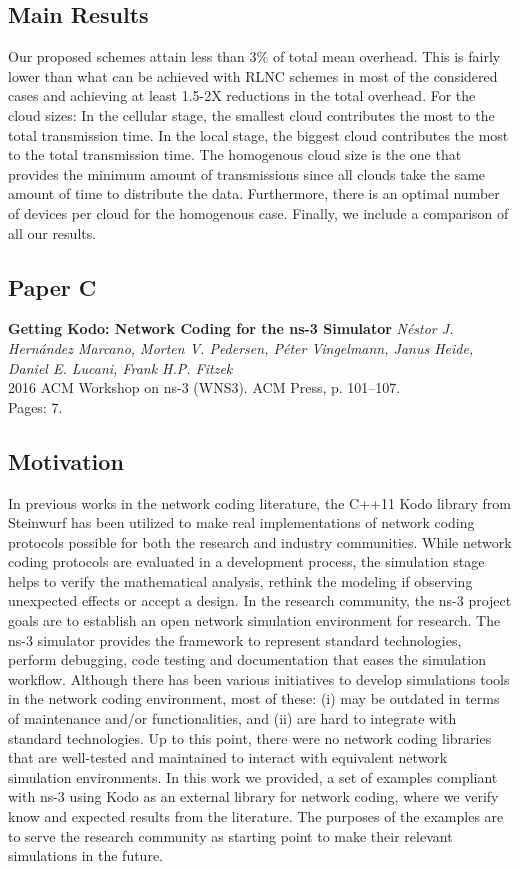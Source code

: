 \subsection*{Main Results}
Our proposed schemes attain less than 3\% of total mean overhead. This is fairly lower than what can be achieved with \ac{RLNC} schemes in most of the considered cases and achieving at least 1.5-2X reductions in the total overhead. For the cloud sizes: In the cellular stage, the smallest cloud contributes the most to the total transmission time. In the local stage, the biggest cloud contributes the most to the total transmission time. The homogenous cloud size is the one that provides the minimum amount of transmissions since all clouds take the same amount of time to distribute the data. Furthermore, there is an optimal number of devices per cloud for the homogenous case. Finally, we include a comparison of all our results. 

\clearpage


\subsection{Paper C}
\textbf{Getting Kodo: Network Coding for the ns-3 Simulator}
\textit{N\'estor J. Hern\'andez Marcano, Morten V. Pedersen, P\'eter
Vingelmann, Janus Heide, Daniel E. Lucani, Frank H.P. Fitzek}
\\ 2016 ACM Workshop on ns-3 (WNS3). ACM Press, p. 101--107.
\\ Pages: 7.
\subsection*{Motivation}
In previous works in the network coding literature, the C++11 Kodo library from Steinwurf has been utilized to make real implementations of network coding protocols possible for both the research and industry communities. While network coding protocols are evaluated in a development process, the simulation stage helps to verify the mathematical analysis, rethink the modeling if observing unexpected effects or accept a design. In the research community, the ns-3 project goals are to establish an open network simulation environment for research. The ns-3 simulator provides the framework to represent standard technologies, perform debugging, code testing and documentation that eases the simulation workflow. Although there has been various initiatives to develop simulations tools in the network coding environment, most of these: (i) may be outdated in terms of maintenance and/or functionalities, and (ii) are hard to integrate with standard technologies. Up to this point, there were no network coding libraries that are well-tested and maintained to interact with equivalent network simulation environments. In this work we provided, a set of examples compliant with ns-3 using Kodo as an external library for network coding, where we verify know and expected results from the literature. The purposes of the examples are to serve the research community as starting point to make their relevant simulations in the future.

